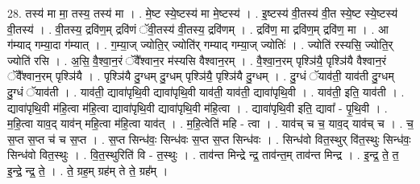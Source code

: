 \documentclass[17pt]{extarticle}
\begin{document}
28. तस्य॑ मा मा॒ तस्य॒ तस्य॑ मा । . मे॒ष्ट स्ये॒ष्टस्य॑ मा मे॒ष्टस्य॑ । . इ॒ष्टस्य॑ वी॒तस्य॑ वी॒त स्ये॒ष्ट स्ये॒ष्टस्य॑ वी॒तस्य॑ । . वी॒तस्य॒ द्रवि॑ण॒म् द्रवि॑णं ॅवी॒तस्य॑ वी॒तस्य॒ द्रवि॑णम् । . द्रवि॑ण॒ मा द्रवि॑ण॒म् द्रवि॑ण॒ मा । . आ ग॑म्याद् गम्या॒दा ग॑म्यात् । . ग॒म्या॒ज् ज्योति॒र् ज्योति॑र् गम्याद् गम्या॒ज् ज्योतिः॑ । . ज्योति॑ रस्यसि॒ ज्योति॒र् ज्योति॑ रसि । . अ॒सि॒ वै॒श्वा॒न॒रं ॅवै᳚श्वान॒र म॑स्यसि वैश्वान॒रम् । . वै॒श्वा॒न॒रम् पृश्ञि॑यै॒ पृश्ञि॑यै वैश्वान॒रं ॅवै᳚श्वान॒रम् पृश्ञि॑यै । . पृश्ञि॑यै दु॒ग्धम् दु॒ग्धम् पृश्ञि॑यै॒ पृश्ञि॑यै दु॒ग्धम् । . दु॒ग्धं ॅयाव॑ती॒ याव॑ती दु॒ग्धम् दु॒ग्धं ॅयाव॑ती । . याव॑ती॒ द्यावा॑पृथि॒वी द्यावा॑पृथि॒वी याव॑ती॒ याव॑ती॒ द्यावा॑पृथि॒वी । . याव॑ती॒ इति॒ याव॑ती । . द्यावा॑पृथि॒वी म॑हि॒त्वा म॑हि॒त्वा द्यावा॑पृथि॒वी द्यावा॑पृथि॒वी म॑हि॒त्वा । . द्यावा॑पृथि॒वी इति॒ द्यावा᳚ - पृ॒थि॒वी । . म॒हि॒त्वा याव॒द् याव॑न् महि॒त्वा म॑हि॒त्वा याव॑त् । . म॒हि॒त्वेति॑ महि - त्वा । . याव॑च् च च॒ याव॒द् याव॑च् च । . च॒ स॒प्त स॒प्त च॑ च स॒प्त । . स॒प्त सिन्ध॑वः॒ सिन्ध॑वः स॒प्त स॒प्त सिन्ध॑वः । . सिन्ध॑वो वित॒स्थुर् वि॑त॒स्थुः सिन्ध॑वः॒ सिन्ध॑वो वित॒स्थुः । . वि॒त॒स्थुरिति॑ वि - त॒स्थुः । . ताव॑न्त मिन्द्रे न्द्र॒ ताव॑न्त॒म् ताव॑न्त मिन्द्र । . इ॒न्द्र॒ ते॒ त॒ इ॒न्द्रे॒ न्द्र॒ ते॒ । . ते॒ ग्रह॒म् ग्रह॑म् ते ते॒ ग्रह᳚म् । \newline
\end{document}
